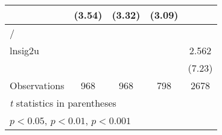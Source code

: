 {\begin{longtable}{l*{4}{c}}
                &   (3.54)         &   (3.32)         &   (3.09)         &                  \\
\midrule
/               &                  &                  &                  &                  \\
lnsig2u         &                  &                  &                  &    2.562\sym{***}\\
                &                  &                  &                  &   (7.23)         \\
\midrule
Observations    &      968         &      968         &      798         &     2678         \\
\bottomrule
\multicolumn{5}{l}{\footnotesize \textit{t} statistics in parentheses}\\
\multicolumn{5}{l}{\footnotesize \sym{*} \(p<0.05\), \sym{**} \(p<0.01\), \sym{***} \(p<0.001\)}\\
\end{longtable}
}

